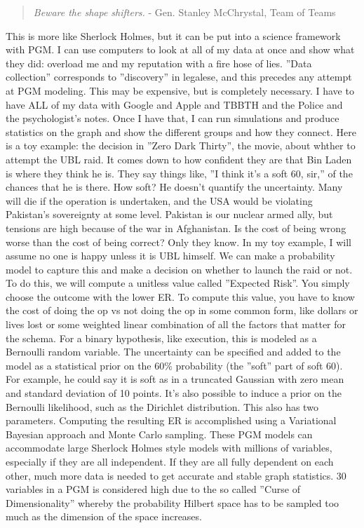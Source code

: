 \documentclass{article}
\begin{document}
\begin{multicols}{2}
\begin{quote}
\emph{Beware the shape shifters.}
  - Gen. Stanley McChrystal, Team of Teams
\end{quote}

This is more like Sherlock Holmes, but it can be put into a science framework with PGM. I can use computers to look at all of my data at once and show what they did: overload me and my reputation with a fire hose of lies. ''Data collection'' corresponds to ''discovery'' in legalese, and this precedes any attempt at PGM modeling. This may be expensive, but is completely necessary. I have to have ALL of my data with Google and Apple and TBBTH and the Police and the psychologist's notes. Once I have that, I can run simulations and produce statistics on the graph and show the different groups and how they connect. Here is a toy example: the decision in ''Zero Dark Thirty'', the movie, about whther to attempt the UBL raid. It comes down to how confident they are that Bin Laden is where they think he is. They say things like, ''I think it's a soft 60, sir,'' of the chances that he is there. How soft? He doesn't quantify the uncertainty. Many will die if the operation is undertaken, and the USA would be violating Pakistan's sovereignty at some level. Pakistan is our nuclear armed ally, but tensions are high because of the war in Afghanistan. Is the cost of being wrong worse than the cost of being correct? Only they know. In my toy example, I will assume no one is happy unless it is UBL himself. We can make a probability model to capture this and make a decision on whether to launch the raid or not. To do this, we will compute a unitless value called ''Expected Risk''. You simply choose the outcome with the lower ER. To compute this value, you have to know the cost of doing the op vs not doing the op in some common form, like dollars or lives lost or some weighted linear combination of all the factors that matter for the schema. For a binary hypothesis, like execution, this is modeled as a Bernoulli random variable. The uncertainty can be specified and added to the model as a statistical prior on the 60\% probability (the ''soft'' part of soft 60). For example, he could say it is soft as in a truncated Gaussian with zero mean and standard deviation of 10 points. It's also possible to induce a prior on the Bernoulli likelihood, such as the Dirichlet distribution. This also has two parameters. Computing the resulting ER is accomplished using a Variational Bayesian approach and Monte Carlo sampling. These PGM models can accommodate large Sherlock Holmes style models with millions of variables, especially if they are all independent. If they are all fully dependent on each other, much more data is needed to get accurate and stable graph statistics. 30 variables in a PGM is considered high due to the so called ''Curse of Dimensionality'' whereby the probability Hilbert space has to be sampled too much as the dimension of the space increases. 

\end{multicols}
\end{document}
